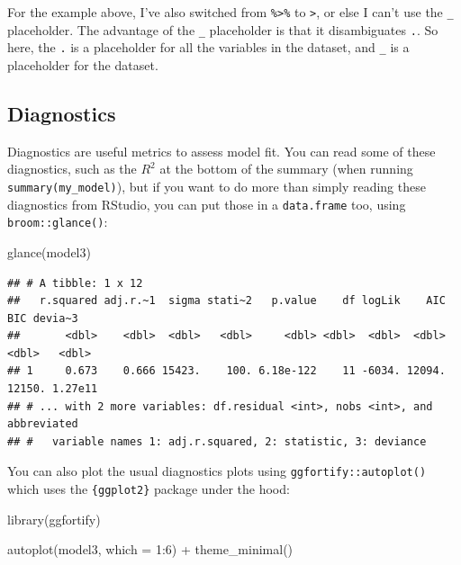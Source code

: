 \documentclass[
]{article}
\newenvironment{Shaded}{\begin{snugshade}}{\end{snugshade}}
\newcommand{\AttributeTok}[1]{\textcolor[rgb]{0.77,0.63,0.00}{#1}}
\newcommand{\DecValTok}[1]{\textcolor[rgb]{0.00,0.00,0.81}{#1}}
\newcommand{\FunctionTok}[1]{\textcolor[rgb]{0.00,0.00,0.00}{#1}}
\newcommand{\NormalTok}[1]{#1}
\newcommand{\SpecialCharTok}[1]{\textcolor[rgb]{0.00,0.00,0.00}{#1}}
\begin{document}
For the example above, I've also switched from \texttt{\%\textgreater{}\%} to \texttt{\textbar{}\textgreater{}}, or else I can't use the \texttt{\_} placeholder.
The advantage of the \texttt{\_} placeholder is that it disambiguates \texttt{.}. So here, the \texttt{.} is a placeholder for
all the variables in the dataset, and \texttt{\_} is a placeholder for the dataset.

\hypertarget{diagnostics}{%
\subsection{Diagnostics}\label{diagnostics}}

Diagnostics are useful metrics to assess model fit. You can read some of these diagnostics, such as
the \(R^2\) at the bottom of the summary (when running \texttt{summary(my\_model)}), but if you want to do
more than simply reading these diagnostics from RStudio, you can put those in a \texttt{data.frame} too,
using \texttt{broom::glance()}:

\begin{Shaded}
\begin{Highlighting}[]
\FunctionTok{glance}\NormalTok{(model3)}
\end{Highlighting}
\end{Shaded}

\begin{verbatim}
## # A tibble: 1 x 12
##   r.squared adj.r.~1  sigma stati~2   p.value    df logLik    AIC    BIC devia~3
##       <dbl>    <dbl>  <dbl>   <dbl>     <dbl> <dbl>  <dbl>  <dbl>  <dbl>   <dbl>
## 1     0.673    0.666 15423.    100. 6.18e-122    11 -6034. 12094. 12150. 1.27e11
## # ... with 2 more variables: df.residual <int>, nobs <int>, and abbreviated
## #   variable names 1: adj.r.squared, 2: statistic, 3: deviance
\end{verbatim}

You can also plot the usual diagnostics plots using \texttt{ggfortify::autoplot()} which uses the
\texttt{\{ggplot2\}} package under the hood:

\begin{Shaded}
\begin{Highlighting}[]
\FunctionTok{library}\NormalTok{(ggfortify)}

\FunctionTok{autoplot}\NormalTok{(model3, }\AttributeTok{which =} \DecValTok{1}\SpecialCharTok{:}\DecValTok{6}\NormalTok{) }\SpecialCharTok{+} \FunctionTok{theme\_minimal}\NormalTok{()}
\end{Highlighting}
\end{Shaded}
\end{document}
